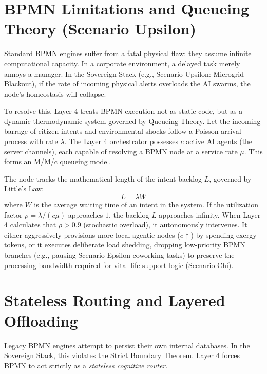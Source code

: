 \section{BPMN Limitations and Queueing Theory (Scenario Upsilon)}
Standard BPMN engines suffer from a fatal physical flaw: they assume infinite computational capacity. In a corporate environment, a delayed task merely annoys a manager. In the Sovereign Stack (e.g., Scenario Upsilon: Microgrid Blackout), if the rate of incoming physical alerts overloads the AI swarms, the node's homeostasis will collapse.

To resolve this, Layer 4 treats BPMN execution not as static code, but as a dynamic thermodynamic system governed by Queueing Theory. 
Let the incoming barrage of citizen intents and environmental shocks follow a Poisson arrival process with rate $\lambda$. The Layer 4 orchestrator possesses $c$ active AI agents (the server channels), each capable of resolving a BPMN node at a service rate $\mu$. This forms an M/M/c queueing model.

The node tracks the mathematical length of the intent backlog $L$, governed by Little's Law:
\begin{equation}
L = \lambda W
\end{equation}
where $W$ is the average waiting time of an intent in the system. If the utilization factor $\rho = \lambda / (c \mu)$ approaches $1$, the backlog $L$ approaches infinity. When Layer 4 calculates that $\rho > 0.9$ (stochastic overload), it autonomously intervenes. It either aggressively provisions more local agentic nodes ($c \uparrow$) by spending exergy tokens, or it executes deliberate load shedding, dropping low-priority BPMN branches (e.g., pausing Scenario Epsilon coworking tasks) to preserve the processing bandwidth required for vital life-support logic (Scenario Chi).

\section{Stateless Routing and Layered Offloading}
Legacy BPMN engines attempt to persist their own internal databases. In the Sovereign Stack, this violates the Strict Boundary Theorem. Layer 4 forces BPMN to act strictly as a \textit{stateless cognitive router}. 

